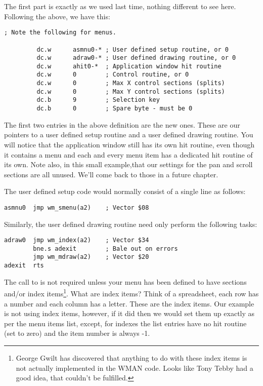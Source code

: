 The first part is exactly as we used last time, nothing different to
    see here. Following the above, we have this:

\begin{lstlisting}[firstnumber=last,caption={AppMenuTest1Win\_asm - Application Window Definition}]
; Note the following for menus.

         dc.w      asmnu0-* ; User defined setup routine, or 0
         dc.w      adraw0-* ; User defined drawing routine, or 0
         dc.w      ahit0-*  ; Application window hit routine
         dc.w      0        ; Control routine, or 0
         dc.w      0        ; Max X control sections (splits)
         dc.w      0        ; Max Y control sections (splits)
         dc.b      9        ; Selection key
         dc.b      0        ; Spare byte - must be 0
\end{lstlisting}

The first two entries in the above definition are the new ones.
    These are our pointers to a user defined setup routine and a user defined
    drawing routine. You will notice that the application window still has
    its own hit routine, even though it contains a menu and each and every
    menu item has a dedicated hit routine of its own. Note also, in this small
    example,that our settings for the pan and scroll sections are all unused.
    We'll come back to those in a future chapter.

The user defined setup code would normally consist of a single line
    as follows:

\begin{lstlisting}[firstnumber=1,caption={AppMenuTest1Win\_asm - Application Window Setup Routine}]
asmnu0  jmp wm_smenu(a2)    ; Vector $08
\end{lstlisting}

Similarly, the user defined drawing routine need only perform the
    following tasks:

\begin{lstlisting}[firstnumber=last,caption={AppMenuTest1Win\_asm - Application Window Drawing Routine}]
adraw0  jmp wm_index(a2)    ; Vector $34
        bne.s adexit        ; Bale out on errors
        jmp wm_mdraw(a2)    ; Vector $20
adexit  rts        
\end{lstlisting}

The call to  is not required unless your menu has been
    defined to have sections and/or index items\footnote{George Gwilt has discovered that anything to do with these index items is not actually implemented in the WMAN code. Looks like Tony Tebby had a good idea, that couldn't be fulfilled.}. What are index items? Think
    of a spreadsheet, each row has a number and each column has a letter.
    These are the index items. Our example is not using index items, however,
    if it did then we would set them up exactly as per the menu items list,
    except, for indexes the list entries have no hit routine (set to zero) and
    the item number is always -{}1.

